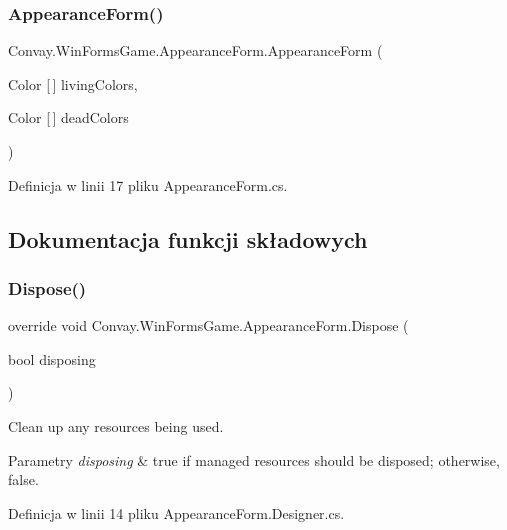 \subsubsection{\texorpdfstring{Appearance\+Form()}{AppearanceForm()}}
{\footnotesize\ttfamily Convay.\+Win\+Forms\+Game.\+Appearance\+Form.\+Appearance\+Form (\begin{DoxyParamCaption}\item[{Color \mbox{[}$\,$\mbox{]}}]{living\+Colors,  }\item[{Color \mbox{[}$\,$\mbox{]}}]{dead\+Colors }\end{DoxyParamCaption})}



Definicja w linii 17 pliku Appearance\+Form.\+cs.



\subsection{Dokumentacja funkcji składowych}
\hypertarget{class_convay_1_1_win_forms_game_1_1_appearance_form_aa81652e532daf2a4968b5f2f5084790d}{}\label{class_convay_1_1_win_forms_game_1_1_appearance_form_aa81652e532daf2a4968b5f2f5084790d} 
\subsubsection{\texorpdfstring{Dispose()}{Dispose()}}
{\footnotesize\ttfamily override void Convay.\+Win\+Forms\+Game.\+Appearance\+Form.\+Dispose (\begin{DoxyParamCaption}\item[{bool}]{disposing }\end{DoxyParamCaption})\hspace{0.3cm}{\ttfamily [protected]}}



Clean up any resources being used. 


\begin{DoxyParams}{Parametry}
{\em disposing} & true if managed resources should be disposed; otherwise, false.\\
\hline
\end{DoxyParams}


Definicja w linii 14 pliku Appearance\+Form.\+Designer.\+cs.



